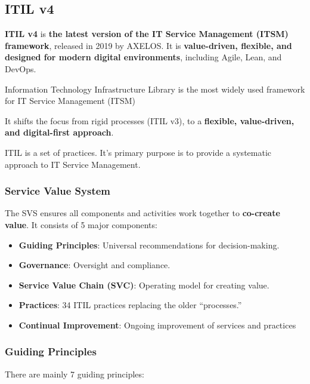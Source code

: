\subsection{ITIL v4}

\noindent

\textbf{ITIL v4} is \textbf{the latest version of the IT Service Management (ITSM) framework}, released in 2019 by AXELOS. It is \textbf{value-driven, flexible, and designed for modern digital environments}, including Agile, Lean, and DevOps.

Information Technology Infrastructure Library is the most widely used framework for IT Service Management (ITSM)

It shifts the focus from rigid processes (ITIL v3), to a \textbf{flexible, value-driven, and digital-first approach}.

ITIL is a set of practices. It's primary purpose is to provide a systematic approach to IT Service Management.

\subsubsection{Service Value System}

\indent 

The SVS ensures all components and activities work together to \textbf{co-create value}. It consists of 5 major components:

\begin{itemize}
    \item \textbf{Guiding Principles}: Universal recommendations for decision-making.
    \item \textbf{Governance}: Oversight and compliance.
    \item \textbf{Service Value Chain (SVC)}: Operating model for creating value.
    \item \textbf{Practices}: 34 ITIL practices replacing the older “processes.”
    \item \textbf{Continual Improvement}: Ongoing improvement of services and practices
\end{itemize}

\subsubsection{Guiding Principles}

\indent 

There are mainly 7 guiding principles:

